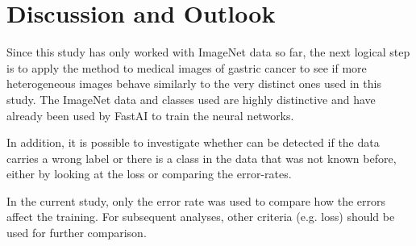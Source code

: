 \documentclass[a4paper,11pt]{scrartcl}
\theoremstyle{definition}
\begin{document}
\section{Discussion and Outlook}

Since this study has only worked with ImageNet data so far, the next logical step is to apply the method to medical images of gastric cancer to see if more heterogeneous images behave similarly to the very distinct ones used in this study. The ImageNet data and classes used are highly distinctive and have already been used by FastAI to train the neural networks.

In addition, it is possible to investigate whether can be detected if the data carries a wrong label or there is a class in the data that was not known before, either by looking at the loss or comparing the error-rates.

In the current study, only the error rate was used to compare how the errors affect the training. For subsequent analyses, other criteria (e.g. loss) should be used for further comparison.
\end{document}
